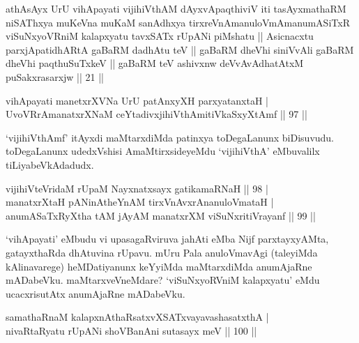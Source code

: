 \begin{kandikeshl}
athAsAyx UrU vihApayati vijihiVthAM dAyxvApaqthiviV iti tasAyxmathaRM niSAThxya muKeVna muKaM sanAdhxya tirxreVnAmanuloVmAmanumASiTxR viSuNxyoVRniM kalapxyatu tavxSATx rUpANi piMshatu || Asicnacxtu parxjApatidhARtA gaBaRM dadhAtu teV || gaBaRM dheVhi siniVvAli gaBaRM dheVhi paqthuSuTxkeV || gaBaRM teV ashivxnw deVvAvAdhatAtxM puSakxrasarxjw || 21 ||
\end{kandikeshl}


\begin{shl}
vihApayati manetxrXVNa UrU patAnxyXH parxyatanxtaH | \\
UvoVRrAmanatxrXNaM ceYtadivxjihiVthAmitiVkaSxyXtAmf \hfill|| 97 || 
\end{shl}

\begin{artha}
`vijihiVthAmf' itAyxdi maMtarxdiMda patinxya toDegaLanunx biDisuvudu. 
toDegaLanunx udedxVshisi AmaMtirxsideyeMdu `vijihiVthA' eMbuvalilx 
tiLiyabeVkAdadudx.
\end{artha}


\begin{shl}
vijihiVteVridaM rUpaM Nayxnatxsayx gatikamaRNaH \hfill|| 98 | \\
manatxrXtaH pANinA\s theYnAM tirxVnAvxrAnanuloVmataH | \\
anumASaTxRyXtha tAM jAyAM manatxrXM viSuNxritiVrayanf \hfill|| 99 || 
\end{shl}

\begin{artha}
`vihApayati' eMbudu vi upasagaRviruva ja{hA}ti eMba Nijf parxtayxyAMta, 
gatayxthaRda dhAtuvina rUpavu. mUru Pala anuloVmavAgi (taleyiMda 
kAlinavarege) heMDatiyanunx keYyiMda maMtarxdiMda anumAjaRne 
mADabeVku. maMtarxveVneMdare? `viSuNxyoRVniM kalapxyatu' eMdu 
ucacxrisutAtx anumAjaRne mADabeVku.
\end{artha}


\begin{shl}
samathaRnaM kalapxnAthaRsatxvXSATx\s vayavashasatxthA | \\
nivaRtaRyatu rUpANi shoVBanAni sutasayx meV \hfill|| 100 || 
\end{shl}

